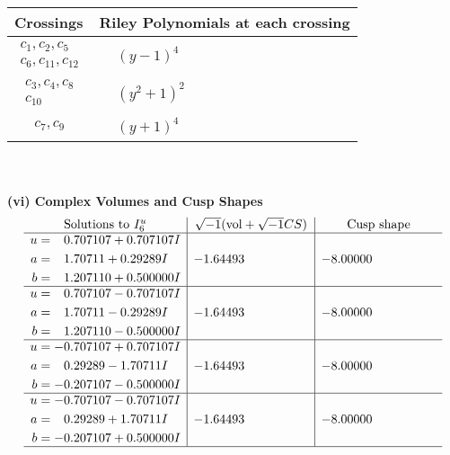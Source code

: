 \documentclass[1p]{elsarticle_modified}
\theoremstyle{definition}
\newcommand{\I}{\sqrt{-1}}
\begin{document}
\begin{tabular}{m{50pt}|m{274pt}}
Crossings & \hspace{64pt}Riley Polynomials at each crossing \\
\hline $$\begin{aligned}c_{1},c_{2},c_{5}\\c_{6},c_{11},c_{12}\end{aligned}$$&$\begin{aligned}
&(y-1)^4
\end{aligned}$\\
\hline $$\begin{aligned}c_{3},c_{4},c_{8}\\c_{10}\end{aligned}$$&$\begin{aligned}
&(y^2+1)^2
\end{aligned}$\\
\hline $$\begin{aligned}c_{7},c_{9}\end{aligned}$$&$\begin{aligned}
&(y+1)^4
\end{aligned}$\\
\hline
\end{tabular}\\~\\
\newpage\flushleft \textbf{(vi) Complex Volumes and Cusp Shapes}
$$\begin{array}{c|c|c}  
\text{Solutions to }I^u_{6}& \I (\text{vol} + \sqrt{-1}CS) & \text{Cusp shape}\\
 \hline 
\begin{aligned}
u &= \phantom{-}0.707107 + 0.707107 I \\
a &= \phantom{-}1.70711 + 0.29289 I \\
b &= \phantom{-}1.207110 + 0.500000 I\end{aligned}
 & -1.64493\phantom{ +0.000000I} & -8.00000\phantom{ +0.000000I} \\ \hline\begin{aligned}
u &= \phantom{-}0.707107 - 0.707107 I \\
a &= \phantom{-}1.70711 - 0.29289 I \\
b &= \phantom{-}1.207110 - 0.500000 I\end{aligned}
 & -1.64493\phantom{ +0.000000I} & -8.00000\phantom{ +0.000000I} \\ \hline\begin{aligned}
u &= -0.707107 + 0.707107 I \\
a &= \phantom{-}0.29289 - 1.70711 I \\
b &= -0.207107 - 0.500000 I\end{aligned}
 & -1.64493\phantom{ +0.000000I} & -8.00000\phantom{ +0.000000I} \\ \hline\begin{aligned}
u &= -0.707107 - 0.707107 I \\
a &= \phantom{-}0.29289 + 1.70711 I \\
b &= -0.207107 + 0.500000 I\end{aligned}
 & -1.64493\phantom{ +0.000000I} & -8.00000\phantom{ +0.000000I}\\
 \hline 
 \end{array}$$\newpage\newpage\renewcommand{\arraystretch}{1}
\end{document}
